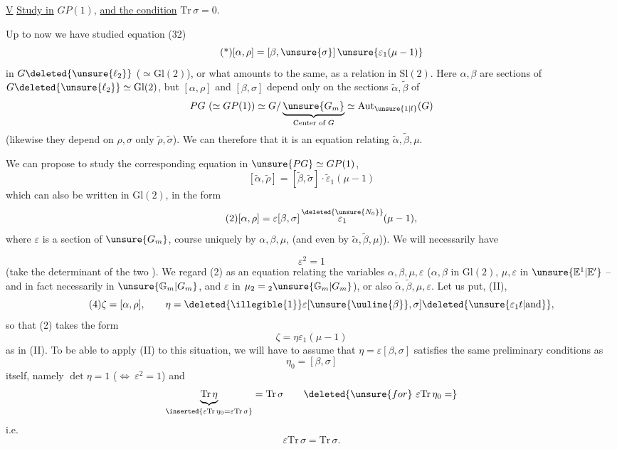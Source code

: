 
\uline{V}\qquad
\uline{Study}\uline{ in}
$GP(1)$, \uline{and the condition} $\mathrm{Tr}\,\sigma=0$.

Up to now we have studied equation (32)
\[
\tag{*}
[\alpha,\rho]=[\beta,\unsure{\sigma}]\,
\unsure{\varepsilon_1(\mu-1)}
\]
in $G\deleted{\unsure{\ell_2}}$ ($\simeq\mathrm{Gl}(2)$), or what amounts to the
same,  as a relation in $\mathrm{Sl}(2)$.
Here $\alpha,\beta$ are  sections of
$G\deleted{\unsure{\ell_2}}\simeq\mathrm{Gl}(2)$, but $[\alpha,\rho]$ and
$[\beta,\sigma]$ depend only on the  sections
$\widetilde\alpha,\widetilde\beta$ of
\[
PG\ (\simeq GP(1))\simeq
G/\underbrace{\unsure{G_m}}_{\text{Center of }G}
\simeq\mathrm{Aut}_{\unsure{1|l}}(G)
\]
(likewise they depend on $\rho,\sigma$ only
 $\widetilde\rho,\widetilde\sigma$).
We can therefore  that it is an equation
relating $\widetilde\alpha,\widetilde\beta,\mu$.

We can propose to study the corresponding equation in
$\unsure{PG}\simeq GP(1)$,
\[
\tag{1}
[\widetilde\alpha,\widetilde\rho]
 =[\widetilde\beta,\widetilde\sigma]\cdot\widetilde\varepsilon_1(\mu-1)
\]
which can also be written in $\mathrm{Gl}(2)$, in the  form
\[
\tag{2}
[\alpha,\rho]=\varepsilon[\beta,\sigma]\,
\overset{\deleted{\unsure{N_0}}}{\varepsilon_1}(\mu-1),
\]
where $\varepsilon$ is a section of $\unsure{G_m}$,
  course uniquely
 by $\alpha,\beta,\mu$,
(and even by $\widetilde\alpha,\widetilde\beta,\mu$)).
We will necessarily have


\[
\tag{3}
\varepsilon^2=1
\]
(take the determinant of the two ). We regard (2) as an equation
relating the variables $\alpha,\beta,\mu,\varepsilon$
($\alpha,\beta$ in $\mathrm{Gl}(2)$, $\mu,\varepsilon$ in
$\unsure{\mathbb E^1|\mathbb E'}$ -- and in fact necessarily in
$\unsure{\mathbb G_m|G_m}$, and $\varepsilon$  in
$\mu_2={}_2\unsure{\mathbb G_m|G_m}$), or also
$\widetilde\alpha,\widetilde\beta,\mu,\varepsilon$.
Let us put,  (II),
\[
\tag{4}
\zeta=[\alpha,\rho],\qquad
\eta=\deleted{\illegible{1}}\varepsilon
[\unsure{\uuline{\beta}},\sigma]\deleted{\unsure{\varepsilon_1 t|\text{and}}},
\]
so that (2) takes the form
\[
\tag{5}
\zeta=\eta\varepsilon_1(\mu-1)
\]
as in (II). To be able to apply (II) to this situation, we will have to
assume that $\eta=\varepsilon[\beta,\sigma]$ satisfies the
same preliminary conditions as
\[
\eta_0=[\beta,\sigma]
\]
itself, namely $\det\eta=1$
($\Longleftrightarrow\ \varepsilon^2=1$) and
\[
\underbrace{\mathrm{Tr}\,\eta}_{\inserted{\varepsilon\mathrm{Tr}\,\eta_0
=\varepsilon\mathrm{Tr}\,\sigma}}
=\mathrm{Tr}\,\sigma
\qquad\deleted{\unsure{for}\ \varepsilon\mathrm{Tr}\,\eta_0=}
\]
i.e.
\[
\varepsilon\mathrm{Tr}\,\sigma=\mathrm{Tr}\,\sigma.
\]

